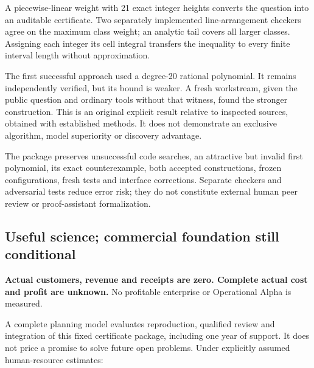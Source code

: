 \documentclass[11pt,a4paper]{article}
\begin{document}
A piecewise-linear weight with 21 exact integer heights converts the
question into an auditable certificate. Two separately implemented
line-arrangement checkers agree on the maximum class weight; an analytic
tail covers all larger classes. Assigning each integer its cell integral
transfers the inequality to every finite interval length without
approximation.

The first successful approach used a degree-20 rational polynomial. It
remains independently verified, but its bound is weaker. A fresh
workstream, given the public question and ordinary tools without that
witness, found the stronger construction. This is an original explicit
result relative to inspected sources, obtained with established methods.
It does not demonstrate an exclusive algorithm, model superiority or
discovery advantage.

The package preserves unsuccessful code searches, an attractive but
invalid first polynomial, its exact counterexample, both accepted
constructions, frozen configurations, fresh tests and interface
corrections. Separate checkers and adversarial tests reduce error risk;
they do not constitute external human peer review or proof-assistant
formalization.


\hypertarget{useful-science-commercial-foundation-still-conditional}{%
\subsection{Useful science; commercial foundation still
conditional}\label{useful-science-commercial-foundation-still-conditional}}

\textbf{Actual customers, revenue and receipts are zero. Complete actual
cost and profit are unknown.} No profitable enterprise or Operational
Alpha is measured.

A complete planning model evaluates reproduction, qualified review and
integration of this fixed certificate package, including one year of
support. It does not price a promise to solve future open problems.
Under explicitly assumed human-resource estimates:
\end{document}
